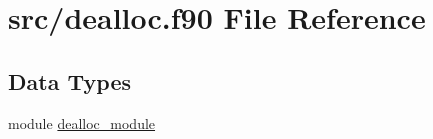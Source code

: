 \hypertarget{dealloc_8f90}{\section{src/dealloc.f90 File Reference}
\label{dealloc_8f90}
}
\subsection*{Data Types}
\begin{DoxyCompactItemize}
\item 
module \hyperlink{classdealloc__module}{dealloc\-\_\-module}
\end{DoxyCompactItemize}
